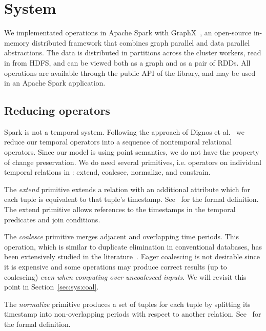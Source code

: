 \section{System}
\label{sec:sys}

We implementated \ql operations in Apache Spark with
GraphX~\cite{DBLP:conf/osdi/GonzalezXDCFS14}, an open-source in-memory
distributed framework that combines graph parallel and data parallel
abstractions.  The data is distributed in partitions across the
cluster workers, read in from HDFS, and can be viewed both as a graph
and as a pair of RDDs.  All \tg operations are available through the
public API of the \ql library, and may be used in an Apache Spark
application.

\subsection{Reducing operators}
\label{sec:sys:reduce}

Spark is not a temporal system.  Following the approach of Dignos et
al.~\cite{Dignos2012} we reduce our temporal operators into a sequence
of nontemporal relational operators.  Since our model is using point
semantics, we do not have the property of change preservation.  We do
need several primitives, i.e. operators on individual temporal
relations in \tve: extend, coalesce, normalize, and constrain.

The {\em extend} primitive extends a relation with an additional
attribute which for each tuple is equivalent to that tuple's
timestamp.  See~\cite{Dignos2012} for the formal definition.  The
extend primitive allows references to the timestamps in the temporal
predicates and join conditions.

The {\em coalesce} primitive merges adjacent and overlapping time
periods.  This operation, which is similar to duplicate elimination in
conventional databases, has been extensively studied in the
literature~\cite{DBLP:conf/vldb/BohlenSS96,DBLP:journals/sigmod/Zimanyi06}.
Eager coalescing is not desirable since it is expensive and some
operations may produce correct results (up to coalescing) {\em even
  when computing over uncoalesced inputs}.  We will revisit this point in
Section~\ref{sec:sys:coal}.

The {\em normalize} primitive produces a set of tuples for each tuple
by splitting its timestamp into non-overlapping periods with respect
to another relation.  See~\cite{Dignos2012} for the formal definition.

